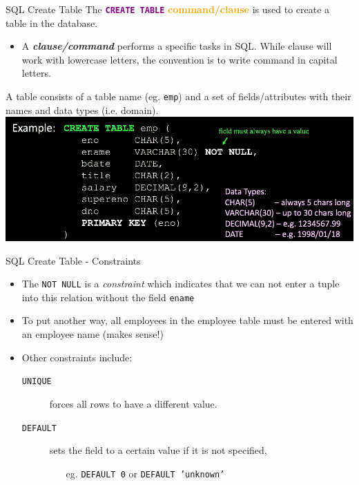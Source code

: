 \documentclass[xcolor=svgnames]{beamer}
\newcommand{\define}[1]{\textbf{\textcolor{orange}{#1}}}
\newcommand{\command}[1]{\texttt{\textbf{\textcolor{DarkMagenta}{#1}}}}
\theoremstyle{example}
\begin{document}
\begin{frame}{SQL Create Table}\label{createtab}
The \command{CREATE TABLE} \define{command/clause}  is used to create a table in the database. \begin{itemize}
\item A \textit{\bf clause/command} performs a  specific tasks in SQL. While clause will work with lowercase letters, the convention is to write command in capital letters. 
\end{itemize}
 A table consists of a table name (eg. {\tt emp}) and a set of fields/attributes with their names and data types (i.e. domain).
\includegraphics[width=1.\textwidth]{img/createTab.png}
\end{frame}



\begin{frame}{SQL Create Table - Constraints}
\begin{itemize}
\item The {\tt NOT NULL}  is a \emph{constraint} which indicates that we can not enter a tuple into this relation without the field {\tt ename}
\medskip
\item To put another way, all employees in the employee table must be entered with an employee name (makes sense!)
\medskip
\item Other constraints include:
\begin{description}
\item[{\tt UNIQUE}]  forces all rows to have a different value.
\item[{\tt DEFAULT}] sets the field to a certain value if it is not specified, 
\begin{itemize}
\item[eg.] {\tt DEFAULT 0} or {\tt DEFAULT 'unknown'} 
\end{itemize}

\end{description}

\end{itemize}
\end{frame}
\end{document}
